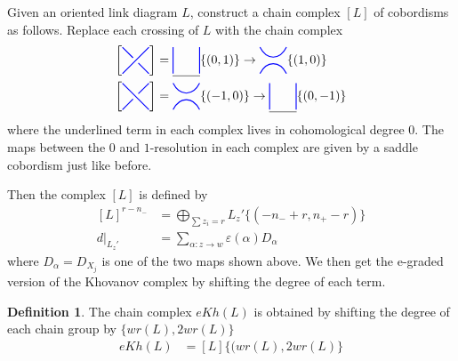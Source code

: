 \documentclass{amsart}
\newcommand{\hackcenter}[1]{
 \xy (0,0)*{#1}; \endxy}
\theoremstyle{plain}
\theoremstyle{definition}
\newtheorem{definition}[theorem]{Definition}
\theoremstyle{definition}
\numberwithin{equation}{section}
\numberwithin{theorem}{section}
\renewcommand{\to}{\rightarrow}
\numberwithin{equation}{section}
\let\epsilon=\varepsilon
\begin{document}
Given an oriented link diagram $L$, construct a chain complex $[L]$ of cobordisms as follows.
Replace each crossing of $L$ with the chain complex
\begin{align}\label{crossing-complexes}
\left[
  \hackcenter{ \begin{tikzpicture} [scale=.75]
\draw[thick,   blue] (0,0) to (1,1);
\draw[thick,   blue] (1,0) to (.6,.4);
\draw[thick,   blue] (0,1) to (.4,.6);
\end{tikzpicture}}\right]
&=
\underline{
\hackcenter{ \begin{tikzpicture} [scale=.75]
\draw[thick,   blue] (0,0) to (0,1);
\draw[thick,   blue] (1,0) to (1,1);
\end{tikzpicture}}} \{(0,1)\}
\to
\hackcenter{ \begin{tikzpicture} [scale=.75]
\draw[thick,   blue] (0,0).. controls ++(.25,.5) and ++(-.25,.5).. (1,0);
\draw[thick,   blue] (0,1).. controls ++(.25,-.5) and ++(-.25,-.5).. (1,1);
\end{tikzpicture}}
\{(1,0)\}
 \\
 \left[
 \hackcenter{ \begin{tikzpicture} [xscale=-1, scale=.75]
\draw[thick,   blue] (0,0) to (1,1);
\draw[thick,   blue] (1,0) to (.6,.4);
\draw[thick,   blue] (0,1) to (.4,.6);
\end{tikzpicture}}\right]
&=
\hackcenter{ \begin{tikzpicture} [scale=.75]
\draw[thick,   blue] (0,0).. controls ++(.25,.5) and ++(-.25,.5).. (1,0);
\draw[thick,   blue] (0,1).. controls ++(.25,-.5) and ++(-.25,-.5).. (1,1);
\end{tikzpicture}}
\{(-1,0)\}
\to
\underline{
\hackcenter{ \begin{tikzpicture} [scale=.75]
\draw[thick,   blue] (0,0) to (0,1);
\draw[thick,   blue] (1,0) to (1,1);
\end{tikzpicture}}} \{(0,-1)\}
\end{align}
where the underlined term in each complex lives in cohomological degree $0$.
The maps between the $0$ and $1$-resolution in each complex are given by a saddle cobordism just like before.

Then the complex $[L]$ is defined by
\begin{align}\label{pre-e-Khov}
  [L]^{r-n_-} &= \bigoplus_{\sum z_i=r} L_z' \{(-n_-+r, n_+-r)\} \\
  d|_{L_z'} &= \sum\limits_{\alpha: z \to w}\epsilon(\alpha)D_{\alpha}
\end{align}
where $D_\alpha=D_{X_j}$ is one of the two maps shown above.
We then get the e-graded version of the Khovanov complex by shifting the degree of each term.
\begin{definition}
The chain complex $eKh(L)$ is obtained by shifting the degree of each chain group by $\{wr(L), 2wr(L)\}$
  \begin{align}\label{e-Khov-1}
  eKh(L)&=[L]\{(wr(L), 2wr(L)\}
\end{align}
\end{definition}
\end{document}
